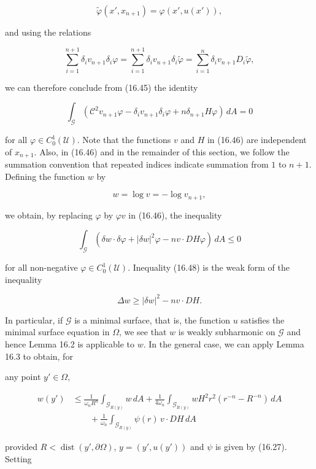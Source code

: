 \[
\tilde{\varphi}(x', x_{n+1}) = \varphi(x', u(x')),
\]

and using the relations

\[
\sum_{i=1}^{n+1} \delta_i v_{n+1}\delta_i\varphi = \sum_{i=1}^{n+1} \delta_i v_{n+1}\delta_i\tilde{\varphi} = \sum_{i=1}^{n} \delta_i v_{n+1} D_i\tilde{\varphi},
\]

we can therefore conclude from (16.45) the identity

\[
\tag{16.46}
\int_{\mathcal{G}} (\mathcal{C}^{2}v_{n+1}\varphi - \delta_i v_{n+1}\delta_i\varphi + n\delta_{n+1} H\varphi)\, dA = 0
\]

for all $\varphi \in C_0^1(\mathcal{U})$. Note that the functions $v$ and $H$ in (16.46) are independent of
$x_{n+1}$. Also, in (16.46) and in the remainder of this section, we follow the summation
convention that repeated indices indicate summation from $1$ to $n+1$. Defining the
function $w$ by

\[
\tag{16.47}
w = \log v = -\log v_{n+1},
\]

we obtain, by replacing $\varphi$ by $\varphi v$ in (16.46), the inequality

\[
\tag{16.48}
\int_{\mathcal{G}} (\delta w \cdot \delta \varphi + |\delta w|^{2}\varphi - nv \cdot D H\varphi)\, dA \leq 0
\]

for all non-negative $\varphi \in C_0^1(\mathcal{U})$. Inequality (16.48) is the weak form of the inequality

\[
\tag{16.49}
\Delta w \geq |\delta w|^{2} - nv \cdot D H.
\]

In particular, if $\mathcal{G}$ is a minimal surface, that is, the function $u$ satisfies the minimal
surface equation in $\Omega$, we see that $w$ is weakly subharmonic on $\mathcal{G}$ and hence Lemma
16.2 is applicable to $w$. In the general case, we can apply Lemma 16.3 to obtain, for


any point $y' \in \Omega,$

\begin{align*}
w(y') &\leq \frac{1}{\omega_n R^n} \int_{\mathcal{G}_{R(y)}} w\, dA + \frac{1}{4\omega_n} \int_{\mathcal{G}_{R(y)}} w H^2 r^{2}(r^{-n} - R^{-n})\, dA \tag{16.50}\\
&\qquad + \frac{1}{\omega_n} \int_{\mathcal{G}_{R(y)}} \psi(r)\, v \cdot DH\, dA
\end{align*}

provided $R < \operatorname{dist}(y', \partial\Omega)$, $y = (y', u(y'))$ and $\psi$ is given by (16.27). Setting

